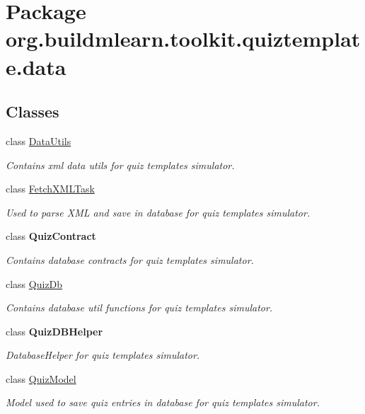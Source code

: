 \hypertarget{namespaceorg_1_1buildmlearn_1_1toolkit_1_1quiztemplate_1_1data}{}\section{Package org.\+buildmlearn.\+toolkit.\+quiztemplate.\+data}
\label{namespaceorg_1_1buildmlearn_1_1toolkit_1_1quiztemplate_1_1data}
\subsection*{Classes}
\begin{DoxyCompactItemize}
\item 
class \hyperlink{classorg_1_1buildmlearn_1_1toolkit_1_1quiztemplate_1_1data_1_1DataUtils}{Data\+Utils}
\begin{DoxyCompactList}\small\item\em Contains xml data utils for quiz template\textquotesingle{}s simulator. \end{DoxyCompactList}\item 
class \hyperlink{classorg_1_1buildmlearn_1_1toolkit_1_1quiztemplate_1_1data_1_1FetchXMLTask}{Fetch\+X\+M\+L\+Task}
\begin{DoxyCompactList}\small\item\em Used to parse X\+ML and save in database for quiz template\textquotesingle{}s simulator. \end{DoxyCompactList}\item 
class {\bfseries Quiz\+Contract}
\begin{DoxyCompactList}\small\item\em Contains database contracts for quiz template\textquotesingle{}s simulator. \end{DoxyCompactList}\item 
class \hyperlink{classorg_1_1buildmlearn_1_1toolkit_1_1quiztemplate_1_1data_1_1QuizDb}{Quiz\+Db}
\begin{DoxyCompactList}\small\item\em Contains database util functions for quiz template\textquotesingle{}s simulator. \end{DoxyCompactList}\item 
class {\bfseries Quiz\+D\+B\+Helper}
\begin{DoxyCompactList}\small\item\em Database\+Helper for quiz template\textquotesingle{}s simulator. \end{DoxyCompactList}\item 
class \hyperlink{classorg_1_1buildmlearn_1_1toolkit_1_1quiztemplate_1_1data_1_1QuizModel}{Quiz\+Model}
\begin{DoxyCompactList}\small\item\em Model used to save quiz entries in database for quiz template\textquotesingle{}s simulator. \end{DoxyCompactList}\end{DoxyCompactItemize}
